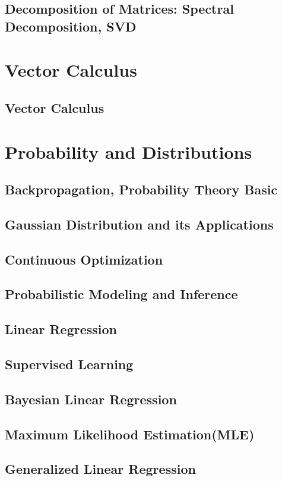 \documentclass[12pt,openany]{book}
\theoremstyle{definition}
\begin{document}
	\section{Decomposition of Matrices: Spectral Decomposition, SVD}
	
	\chapter{Vector Calculus}
	\section{Vector Calculus}
	
	\chapter{Probability and Distributions}
	\section{Backpropagation, Probability Theory Basic}
	\section{Gaussian Distribution and its Applications}
	\section{Continuous Optimization}
	\section{Probabilistic Modeling and Inference}
	\section{Linear Regression}
	\section{Supervised Learning}
	\section{Bayesian Linear Regression}
	\section{Maximum Likelihood Estimation(MLE)}
	\section{Generalized Linear Regression}
\end{document}

